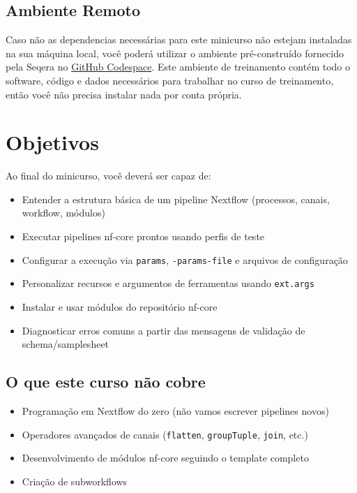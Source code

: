 \documentclass[
  brazilian,
  letterpaper,
  DIV=11,
  numbers=noendperiod]{scrreprt}
\providecommand{\tightlist}{%
  \setlength{\itemsep}{0pt}\setlength{\parskip}{0pt}}
\begin{document}
\section{Ambiente Remoto}\label{ambiente-remoto}

Caso não as dependencias necessárias para este minicurso não estejam
instaladas na sua máquina local, você poderá utilizar o ambiente
pré-construído fornecido pela Seqera no
\href{https://codespaces.new/nextflow-io/training?quickstart=1&ref=3.6.1}{GitHub
Codespace}. Este ambiente de treinamento contém todo o software, código
e dados necessários para trabalhar no curso de treinamento, então você
não precisa instalar nada por conta própria.


\chapter{Objetivos}\label{objetivos}

Ao final do minicurso, você deverá ser capaz de:

\begin{itemize}
\tightlist
\item
  Entender a estrutura básica de um pipeline Nextflow (processos,
  canais, workflow, módulos)
\item
  Executar pipelines nf-core prontos usando perfis de teste
\item
  Configurar a execução via \texttt{params}, \texttt{-params-file} e
  arquivos de configuração
\item
  Personalizar recursos e argumentos de ferramentas usando
  \texttt{ext.args}
\item
  Instalar e usar módulos do repositório nf-core
\item
  Diagnosticar erros comuns a partir das mensagens de validação de
  schema/samplesheet
\end{itemize}

\section{\texorpdfstring{O que este curso \textbf{não}
cobre}{O que este curso não cobre}}\label{o-que-este-curso-nuxe3o-cobre}

\begin{itemize}
\tightlist
\item
  Programação em Nextflow do zero (não vamos escrever pipelines novos)
\item
  Operadores avançados de canais (\texttt{flatten}, \texttt{groupTuple},
  \texttt{join}, etc.)
\item
  Desenvolvimento de módulos nf-core seguindo o template completo
\item
  Criação de subworkflows
\end{itemize}
\end{document}
